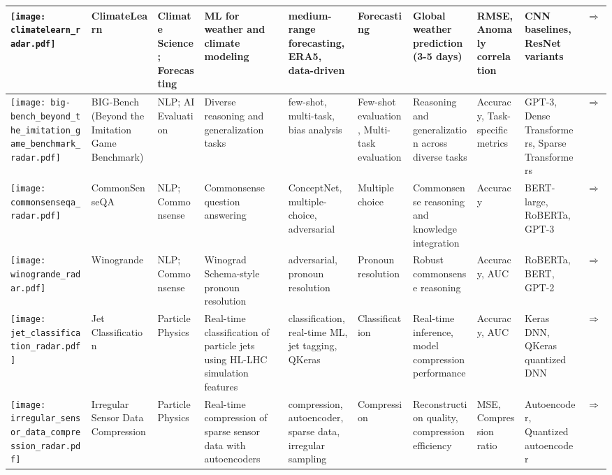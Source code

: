 \begin{landscape}
{\begin{longtable}{|p{}|p{}|p{}|p{}|p{}|p{}|p{}|p{}|p{}|p{}|}
\texttt{[image: climatelearn\_radar.pdf]} & ClimateLearn & Climate Science; Forecasting & ML for weather and climate modeling & medium-range forecasting, ERA5, data-driven & Forecasting & Global weather prediction (3-5 days) & RMSE, Anomaly correlation & CNN baselines, ResNet variants & \cite{nguyen2023climatelearnbenchmarkingmachinelearning}\href{https://arxiv.org/abs/2307.01909}{$\Rightarrow$} \\ \hline
\texttt{[image: big-bench\_beyond\_the\_imitation\_game\_benchmark\_radar.pdf]} & BIG-Bench (Beyond the Imitation Game Benchmark) & NLP; AI Evaluation & Diverse reasoning and generalization tasks & few-shot, multi-task, bias analysis & Few-shot evaluation, Multi-task evaluation & Reasoning and generalization across diverse tasks & Accuracy, Task-specific metrics & GPT-3, Dense Transformers, Sparse Transformers & \cite{srivastava2023imitationgamequantifyingextrapolating}\href{https://github.com/google/BIG-bench}{$\Rightarrow$} \\ \hline
\texttt{[image: commonsenseqa\_radar.pdf]} & CommonSenseQA & NLP; Commonsense & Commonsense question answering & ConceptNet, multiple-choice, adversarial & Multiple choice & Commonsense reasoning and knowledge integration & Accuracy & BERT-large, RoBERTa, GPT-3 & \cite{talmor2019commonsenseqaquestionansweringchallenge}\href{https://paperswithcode.com/paper/commonsenseqa-a-question-answering-challenge}{$\Rightarrow$} \\ \hline
\texttt{[image: winogrande\_radar.pdf]} & Winogrande & NLP; Commonsense & Winograd Schema-style pronoun resolution & adversarial, pronoun resolution & Pronoun resolution & Robust commonsense reasoning & Accuracy, AUC & RoBERTa, BERT, GPT-2 & \cite{sakaguchi2019winograndeadversarialwinogradschema}\href{https://leaderboard.allenai.org/winogrande/submissions/public}{$\Rightarrow$} \\ \hline
\texttt{[image: jet\_classification\_radar.pdf]} & Jet Classification & Particle Physics & Real-time classification of particle jets using HL-LHC simulation features & classification, real-time ML, jet tagging, QKeras & Classification & Real-time inference, model compression performance & Accuracy, AUC & Keras DNN, QKeras quantized DNN & \cite{duarte2022fastml}\href{https://github.com/fastmachinelearning/fastml-science/tree/main/jet-classify}{$\Rightarrow$} \\ \hline
\texttt{[image: irregular\_sensor\_data\_compression\_radar.pdf]} & Irregular Sensor Data Compression & Particle Physics & Real-time compression of sparse sensor data with autoencoders & compression, autoencoder, sparse data, irregular sampling & Compression & Reconstruction quality, compression efficiency & MSE, Compression ratio & Autoencoder, Quantized autoencoder & \cite{duarte2022fastmlsciencebenchmarksaccelerating}\href{https://github.com/fastmachinelearning/fastml-science/tree/main/sensor-data-compression}{$\Rightarrow$} \\ \hline

\end{longtable}}
\end{landscape}
